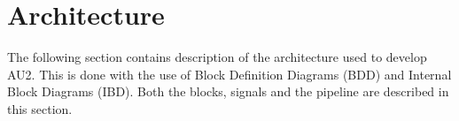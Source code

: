 \chapter{Architecture}
The following section contains description of the architecture used to develop AU2. This is done with the use of Block Definition Diagrams (BDD) and Internal Block Diagrams (IBD). Both the blocks, signals and the pipeline are described in this section.







